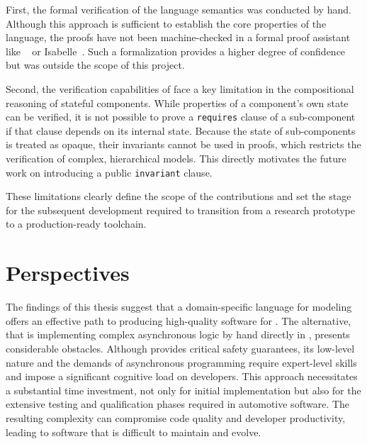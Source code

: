 First, the formal verification of the language semantics was conducted by hand. Although this
approach is sufficient to establish the core properties of the language, the proofs have not been
machine-checked in a formal proof assistant like \Rocq~\cite{rocq} or
Isabelle~\cite{DBLP:books/sp/NipkowPW02}. Such a formalization provides a higher degree of
confidence but was outside the scope of this project.

Second, the verification capabilities of \GReusot face a key limitation in the compositional
reasoning of stateful components. While properties of a component's own state can be verified,
it is not possible to prove a \texttt{requires} clause of a sub-component if that clause depends on
its internal state. Because the state of sub-components is treated as opaque, their invariants
cannot be used in proofs, which restricts the verification of complex, hierarchical models. This
directly motivates the future work on introducing a public \texttt{invariant} clause.

These limitations clearly define the scope of the contributions and set the stage for the
subsequent development required to transition \GRust from a research prototype to a
production-ready toolchain.

\section{Perspectives}
\label{sec:conclusion:perspectives}

The findings of this thesis suggest that a domain-specific language for modeling offers an effective
path to producing high-quality software for \sdv. The alternative, that is
implementing complex asynchronous logic by hand directly in \Rust, presents considerable obstacles.
Although \Rust provides critical safety guarantees, its low-level nature and the demands of
asynchronous programming require expert-level skills and impose a significant cognitive load on
developers. This approach necessitates a substantial time investment, not only for initial
implementation but also for the extensive testing and qualification phases required in automotive
software. The resulting complexity can compromise code quality and developer productivity, leading
to software that is difficult to maintain and evolve.


